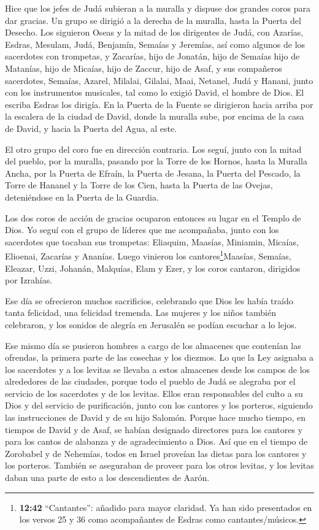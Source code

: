  Hice que los jefes de Judá subieran a la muralla y dispuse
dos grandes coros para dar gracias. Un grupo se dirigió a la derecha de
la muralla, hasta la Puerta del Desecho.  Los siguieron
Oseas y la mitad de los dirigentes de Judá,  con Azarías,
Esdras, Mesulam,  Judá, Benjamín, Semaías y Jeremías,
 así como algunos de los sacerdotes con trompetas, y
Zacarías, hijo de Jonatán, hijo de Semaías hijo de Matanías, hijo de
Micaías, hijo de Zaccur, hijo de Asaf,  y sus compañeros
sacerdotes, Semaías, Azarel, Milalai, Gilalai, Maai, Netanel, Judá y
Hanani, junto con los instrumentos musicales, tal como lo exigió David,
el hombre de Dios. El escriba Esdras los dirigía.  En la
Puerta de la Fuente se dirigieron hacia arriba por la escalera de la
ciudad de David, donde la muralla sube, por encima de la casa de David,
y hacia la Puerta del Agua, al este.

 El otro grupo del coro fue en dirección contraria. Los
seguí, junto con la mitad del pueblo, por la muralla, pasando por la
Torre de los Hornos, hasta la Muralla Ancha,  por la Puerta
de Efraín, la Puerta de Jesana, la Puerta del Pescado, la Torre de
Hananel y la Torre de los Cien, hasta la Puerta de las Ovejas,
deteniéndose en la Puerta de la Guardia.

 Los dos coros de acción de gracias ocuparon entonces su
lugar en el Templo de Dios. Yo seguí con el grupo de líderes que me
acompañaba,  junto con los sacerdotes que tocaban sus
trompetas: Eliaquim, Maasías, Miniamin, Micaías, Elioenai, Zacarías y
Ananías.  Luego vinieron los cantores\footnote{\textbf{12:42}
  ``Cantantes'': añadido para mayor claridad. Ya han sido presentados en
  los versos 25 y 36 como acompañantes de Esdras como cantantes/músicos.}Maasías,
Semaías, Eleazar, Uzzi, Johanán, Malquías, Elam y Ezer, y los coros
cantaron, dirigidos por Izrahías.

 Ese día se ofrecieron muchos sacrificios, celebrando que
Dios les había traído tanta felicidad, una felicidad tremenda. Las
mujeres y los niños también celebraron, y los sonidos de alegría en
Jerusalén se podían escuchar a lo lejos.

 Ese mismo día se pusieron hombres a cargo de los almacenes
que contenían las ofrendas, la primera parte de las cosechas y los
diezmos. Lo que la Ley asignaba a los sacerdotes y a los levitas se
llevaba a estos almacenes desde los campos de los alrededores de las
ciudades, porque todo el pueblo de Judá se alegraba por el servicio de
los sacerdotes y de los levitas.  Ellos eran responsables
del culto a su Dios y del servicio de purificación, junto con los
cantores y los porteros, siguiendo las instrucciones de David y de su
hijo Salomón.  Porque hace mucho tiempo, en tiempos de
David y de Asaf, se habían designado directores para los cantores y para
los cantos de alabanza y de agradecimiento a Dios.  Así que
en el tiempo de Zorobabel y de Nehemías, todos en Israel proveían las
dietas para los cantores y los porteros. También se aseguraban de
proveer para los otros levitas, y los levitas daban una parte de esto a
los descendientes de Aarón.

